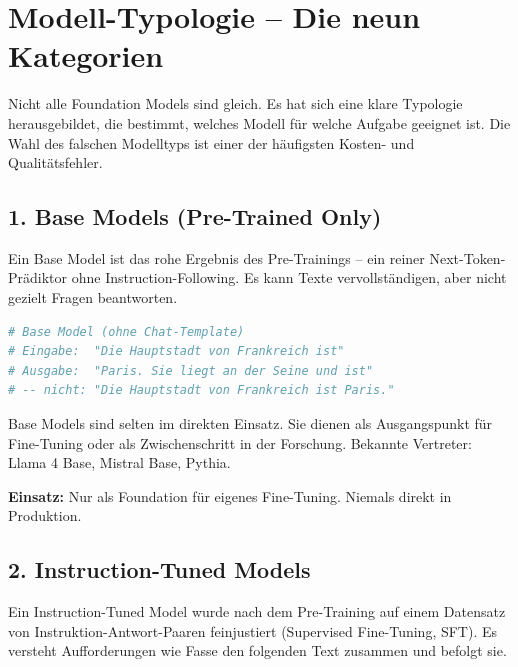 
\section{Modell-Typologie -- Die neun Kategorien}

Nicht alle Foundation Models sind gleich. Es hat sich eine klare Typologie herausgebildet, die bestimmt, welches Modell für welche Aufgabe geeignet ist. Die Wahl des falschen Modelltyps ist einer der häufigsten Kosten- und Qualitätsfehler.

\subsection{1. Base Models (Pre-Trained Only)}

Ein Base Model ist das rohe Ergebnis des Pre-Trainings -- ein reiner Next-Token-Prädiktor ohne Instruction-Following. Es kann Texte vervollständigen, aber nicht gezielt Fragen beantworten.

\begin{lstlisting}[language=Python, caption={Base Model -- reine Textgeneration}, label=lst:base-model]
# Base Model (ohne Chat-Template)
# Eingabe:  "Die Hauptstadt von Frankreich ist"
# Ausgabe:  "Paris. Sie liegt an der Seine und ist"
# -- nicht: "Die Hauptstadt von Frankreich ist Paris."
\end{lstlisting}

Base Models sind selten im direkten Einsatz. Sie dienen als Ausgangspunkt für Fine-Tuning oder als Zwischenschritt in der Forschung. Bekannte Vertreter: Llama 4 Base, Mistral Base, Pythia.

\textbf{Einsatz:} Nur als Foundation für eigenes Fine-Tuning. Niemals direkt in Produktion.

\subsection{2. Instruction-Tuned Models}

Ein Instruction-Tuned Model wurde nach dem Pre-Training auf einem Datensatz von Instruktion-Antwort-Paaren feinjustiert (Supervised Fine-Tuning, SFT). Es versteht Aufforderungen wie \glqq Fasse den folgenden Text zusammen\grqq{} und befolgt sie.


